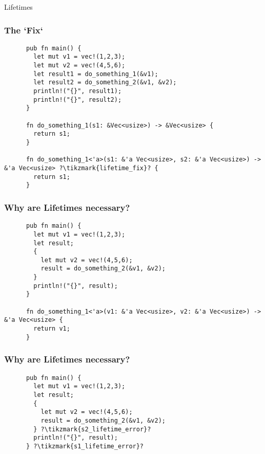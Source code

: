 \begin{section}{Lifetimes}
  \begin{frame}[fragile]
    \frametitle{The `Fix`}
    \begin{verbatim}
      pub fn main() {
        let mut v1 = vec!(1,2,3);
        let mut v2 = vec!(4,5,6);
        let result1 = do_something_1(&v1);
        let result2 = do_something_2(&v1, &v2);
        println!("{}", result1);
        println!("{}", result2);
      }

      fn do_something_1(s1: &Vec<usize>) -> &Vec<usize> {
        return s1;
      }

      fn do_something_1<'a>(s1: &'a Vec<usize>, s2: &'a Vec<usize>) -> &'a Vec<usize> ?\tikzmark{lifetime_fix}? {
        return s1;
      }
    \end{verbatim}
  \end{frame}

    \begin{frame}[fragile]
    \frametitle{Why are Lifetimes necessary? \cite{RustLangCh10}}
    \begin{verbatim}
      pub fn main() {
        let mut v1 = vec!(1,2,3);
        let result;
        {
          let mut v2 = vec!(4,5,6);
          result = do_something_2(&v1, &v2);
        }
        println!("{}", result);
      }

      fn do_something_1<'a>(v1: &'a Vec<usize>, v2: &'a Vec<usize>) -> &'a Vec<usize> {
        return v1;
      }
    \end{verbatim}
  \end{frame}

  \begin{frame}[fragile]
    \frametitle{Why are Lifetimes necessary?}
    \begin{verbatim}
      pub fn main() {
        let mut v1 = vec!(1,2,3);
        let result;
        {
          let mut v2 = vec!(4,5,6);
          result = do_something_2(&v1, &v2);
        } ?\tikzmark{s2_lifetime_error}?
        println!("{}", result);
      } ?\tikzmark{s1_lifetime_error}?


\end{verbatim}
\end{frame}
\end{section}
